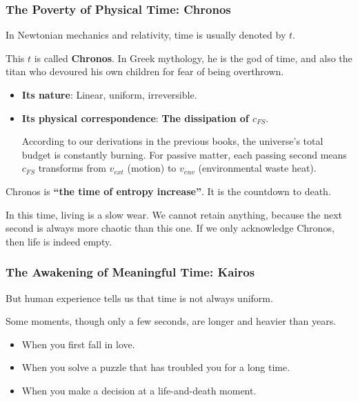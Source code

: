 \subsubsection{The Poverty of Physical Time: Chronos}

In Newtonian mechanics and relativity, time is usually denoted by \textbf{$t$}.

This $t$ is called \textbf{Chronos}. In Greek mythology, he is the god of time, and also the titan who devoured his own children for fear of being overthrown.

\begin{itemize}
\item \textbf{Its nature}: Linear, uniform, irreversible.

\item \textbf{Its physical correspondence}: \textbf{The dissipation of $c_{FS}$}.

    According to our derivations in the previous books, the universe's total budget is constantly burning. For passive matter, each passing second means $c_{FS}$ transforms from $v_{ext}$ (motion) to $v_{env}$ (environmental waste heat).
\end{itemize}

Chronos is \textbf{``the time of entropy increase''}. It is the countdown to death.

In this time, living is a slow wear. We cannot retain anything, because the next second is always more chaotic than this one. If we only acknowledge Chronos, then life is indeed empty.

\subsubsection{The Awakening of Meaningful Time: Kairos}

But human experience tells us that time is not always uniform.

Some moments, though only a few seconds, are longer and heavier than years.

\begin{itemize}
\item When you first fall in love.

\item When you solve a puzzle that has troubled you for a long time.

\item When you make a decision at a life-and-death moment.
\end{itemize}


